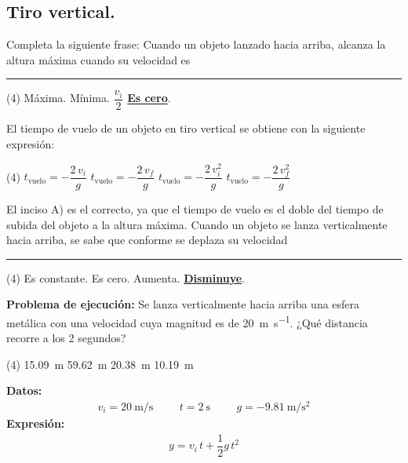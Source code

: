 \documentclass[12pt, letter]{exam}
\begin{document}
\begin{questions}
    \newpage

    \section{Tiro vertical.}

    \question Completa la siguiente frase: Cuando un objeto lanzado hacia arriba, alcanza la altura máxima cuando su velocidad es \rule{2cm}{0.3mm}
    \begin{tasks}(4)
        \task Máxima.
        \task Mínima.
        \task $\dfrac{v_{i}}{2}$
        \task \underline{\textbf{Es cero}}.
    \end{tasks}
    \question El tiempo de vuelo de un objeto en tiro vertical se obtiene con la siguiente expresión:
    \begin{tasks}(4)
        \task $t_{\text{vuelo}} = - \dfrac{2 \, v_{i}}{g}$
        \task $t_{\text{vuelo}} = - \dfrac{2 \, v_{f}}{g}$
        \task $t_{\text{vuelo}} = - \dfrac{2 \, v_{i}^{2}}{g}$
        \task $t_{\text{vuelo}} = - \dfrac{2 \, v_{f}^{2}}{g}$
    \end{tasks}
    El inciso A) es el correcto, ya que el tiempo de vuelo es el doble del tiempo de subida del objeto a la altura máxima.
    \question Cuando un objeto se lanza verticalmente hacia arriba, se sabe que conforme se deplaza su velocidad \rule{2cm}{0.3mm}
    \begin{tasks}(4)
        \task Es constante.
        \task Es cero.
        \task Aumenta.
        \task \underline{\textbf{Disminuye}}.
    \end{tasks}
    \question \label{Problema_03} \textbf{Problema de ejecución: }Se lanza verticalmente hacia arriba una esfera metálica con una velocidad cuya magnitud es de \SI{20}{\meter\per\second}. ¿Qué distancia recorre a los \num{2} segundos?
    \begin{tasks}(4)
        \task \SI{15.09}{\meter}
        \task \SI{59.62}{\meter}
        \task \SI{20.38}{\meter}
        \task \SI{10.19}{\meter}
    \end{tasks}
    \textbf{Datos:}
    \begin{align*}
    v_{i} = \SI{20}{\meter\per\second} \hspace{1cm} t = \SI{2}{\second} \hspace{1cm} g = - \SI{9.81}{\meter\per\square\second}
    \end{align*}
    \textbf{Expresión:}
    \begin{align*}
    y = v_{i} \, t + \dfrac{1}{2} g \, t^{2}
    \end{align*}

\end{questions}
\end{document}
